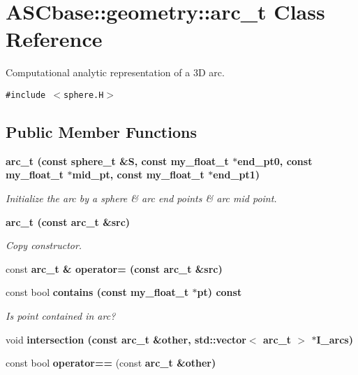 \section{ASCbase::geometry::arc\_\-t Class Reference}
\label{classASCbase_1_1geometry_1_1arc__t}
Computational analytic representation of a 3D arc.  


{\tt \#include $<$sphere.H$>$}

\subsection*{Public Member Functions}
\begin{CompactItemize}
\item 
\bf{arc\_\-t} (const sphere\_\-t \&S, const my\_\-float\_\-t $\ast$end\_\-pt0, const my\_\-float\_\-t $\ast$mid\_\-pt, const my\_\-float\_\-t $\ast$end\_\-pt1)\label{classASCbase_1_1geometry_1_1arc__t_fd9cea33957ae88b1f380bf809cbbff6}

\begin{CompactList}\small\item\em Initialize the arc by a sphere \& arc end points \& arc mid point. \item\end{CompactList}\item 
\bf{arc\_\-t} (const \bf{arc\_\-t} \&src)\label{classASCbase_1_1geometry_1_1arc__t_18b1410a465b4add59d54d8654bf8842}

\begin{CompactList}\small\item\em Copy constructor. \item\end{CompactList}\item 
const \bf{arc\_\-t} \& \textbf{operator=} (const \bf{arc\_\-t} \&src)\label{classASCbase_1_1geometry_1_1arc__t_3b16dc08c008f6d80be326665a19a1a1}

\item 
const bool \bf{contains} (const my\_\-float\_\-t $\ast$pt) const \label{classASCbase_1_1geometry_1_1arc__t_01ba159b58239264350e90caa746dca7}

\begin{CompactList}\small\item\em Is point contained in arc? \item\end{CompactList}\item 
void \bf{intersection} (const \bf{arc\_\-t} \&other, std::vector$<$ \bf{arc\_\-t} $>$ $\ast$I\_\-arcs)
\item 
const bool \textbf{operator==} (const \bf{arc\_\-t} \&other)\label{classASCbase_1_1geometry_1_1arc__t_b08aec83d224c06d7b35f6fdcc70d478}


\end{CompactItemize}
